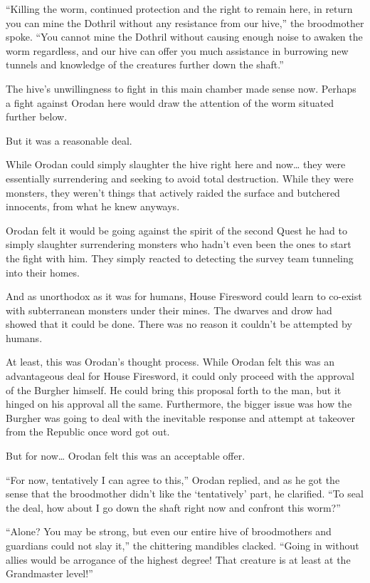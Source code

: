 \documentclass[a4paper,10pt]{book}
\begin{document}
“Killing the worm, continued protection and the right to remain here, in return you can mine the Dothril without any resistance from our hive,” the broodmother spoke. “You cannot mine the Dothril without causing enough noise to awaken the worm regardless, and our hive can offer you much assistance in burrowing new tunnels and knowledge of the creatures further down the shaft.”\par
The hive's unwillingness to fight in this main chamber made sense now. Perhaps a fight against Orodan here would draw the attention of the worm situated further below.\par
But it was a reasonable deal.\par
While Orodan could simply slaughter the hive right here and now… they were essentially surrendering and seeking to avoid total destruction. While they were monsters, they weren’t things that actively raided the surface and butchered innocents, from what he knew anyways.\par
Orodan felt it would be going against the spirit of the second Quest he had to simply slaughter surrendering monsters who hadn’t even been the ones to start the fight with him. They simply reacted to detecting the survey team tunneling into their homes.\par
And as unorthodox as it was for humans, House Firesword could learn to co-exist with subterranean monsters under their mines. The dwarves and drow had showed that it could be done. There was no reason it couldn’t be attempted by humans.\par
At least, this was Orodan’s thought process. While Orodan felt this was an advantageous deal for House Firesword, it could only proceed with the approval of the Burgher himself. He could bring this proposal forth to the man, but it hinged on his approval all the same. Furthermore, the bigger issue was how the Burgher was going to deal with the inevitable response and attempt at takeover from the Republic once word got out.\par
But for now… Orodan felt this was an acceptable offer.\par
“For now, tentatively I can agree to this,” Orodan replied, and as he got the sense that the broodmother didn’t like the ‘tentatively’ part, he clarified. “To seal the deal, how about I go down the shaft right now and confront this worm?”\par
“Alone? You may be strong, but even our entire hive of broodmothers and guardians could not slay it,” the chittering mandibles clacked. “Going in without allies would be arrogance of the highest degree! That creature is at least at the Grandmaster level!”\par
\end{document}
